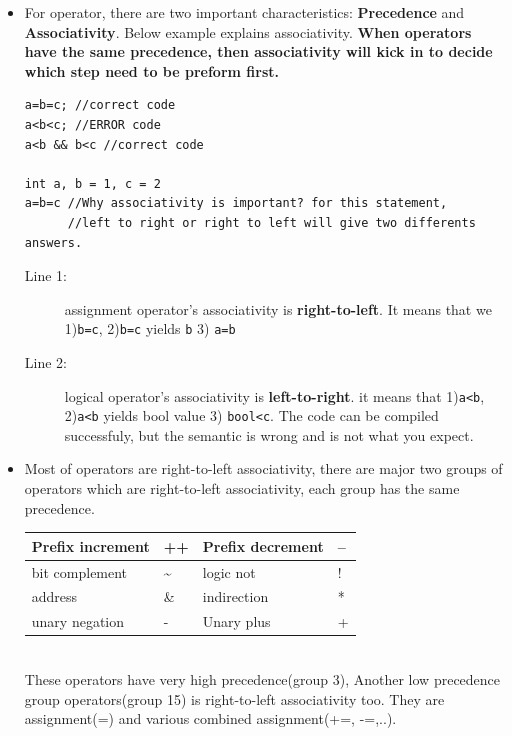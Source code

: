 \documentclass[a4paper,11pt,twoside]{book}
\newcommand{\tophline}{\hline }
\newcommand{\bottomhline}{\\ \hline }
\newcommand{\tophline}{ }
\newcommand{\bottomhline}{ }
\begin{document}
\begin{itemize}
	\item For operator, there are two important characteristics: \textbf{Precedence} and \textbf{Associativity}. Below example explains associativity. \textbf{When operators have the same precedence, then associativity will kick in to decide which step need to be preform first.}
	
\begin{lstlisting}
a=b=c; //correct code
a<b<c; //ERROR code
a<b && b<c //correct code

int a, b = 1, c = 2
a=b=c //Why associativity is important? for this statement, 
      //left to right or right to left will give two differents answers. 
\end{lstlisting}

\begin{description}
	\item[Line 1:] assignment operator's associativity is \textbf{right-to-left}. It means that we 1)\texttt{b=c}, 2)\texttt{b=c} yields \texttt{b} 3) \texttt{a=b} 
	
	\item[Line 2:] logical operator's associativity is \textbf{left-to-right}. it means that 1)\texttt{a<b}, 2)\texttt{a<b} yields bool value 3) \texttt{bool<c}. The code can be compiled successfuly, but the semantic is wrong and is not what you expect.  
\end{description}

    \item Most of operators are right-to-left associativity, there are major two groups of operators which are right-to-left associativity, each group has the same precedence.

\begin{tabular}{|p{}|p{}|p{}|p{}|}
	\tophline
    Prefix increment & ++ & Prefix decrement & --\\
	\tophline
    bit complement & \~{} & logic not & ! \\
	\tophline
    address & \& & indirection & * \\
	\tophline
    unary negation & - & Unary plus & +
	\bottomhline
\end{tabular} \\
These operators have very high precedence(group 3), Another low precedence group operators(group 15) is right-to-left associativity too. They are assignment(=) and various combined assignment(+=, -=,..).


\end{itemize}
\end{document}
